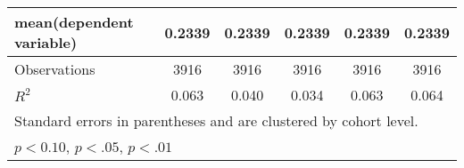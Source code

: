 \begin{table}[htbp]
\begin{adjustbox}{max width=0.68\textwidth}
\begin{tabular}{l*{5}{c}}
\hline
mean(dependent variable)        &     0.2339         &    0.2339        &   0.2339        &   0.2339        &   0.2339        \\
\hline
Observations        &        3916         &        3916         &        3916         &        3916         &        3916         \\
\(R^{2}\)           &       0.063         &       0.040         &       0.034         &       0.063         &       0.064         \\
\hline\hline
\multicolumn{6}{l}{\footnotesize Standard errors in parentheses and are clustered by cohort level.}\\
\multicolumn{6}{l}{\footnotesize \sym{*} \(p<0.10\), \sym{**} \(p<.05\), \sym{***} \(p<.01\)}\\
\end{tabular}%
	\end{adjustbox}
\end{table}